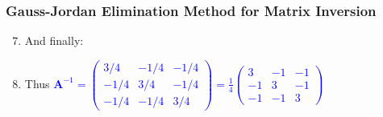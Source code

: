 \documentclass[10pt,compress,handout,ignorenonframetext]{beamer}
\begin{document}
\begin{frame}
\begin{enumerate}
  \end{enumerate}
\end{frame}


\begin{frame}
  \frametitle{Gauss-Jordan Elimination Method for Matrix Inversion} 
  \begin{enumerate}
  \setcounter{enumi}{6}
     \item <1-> And finally: 
     \item <2-> Thus \textcolor{blue}{$\bm{A}^{-1} = \begin{pmatrix} 3/4 & -1/4 & -1/4 \\ -1/4 & 3/4 & -1/4 \\ -1/4 & -1/4 & 3/4 \end{pmatrix} = \displaystyle\frac{1}{4} \begin{pmatrix} 3 & -1 & -1 \\ -1 & 3 & -1 \\ -1 & -1 & 3 \end{pmatrix}$}
  \end{enumerate}
\end{frame}
\end{document}

